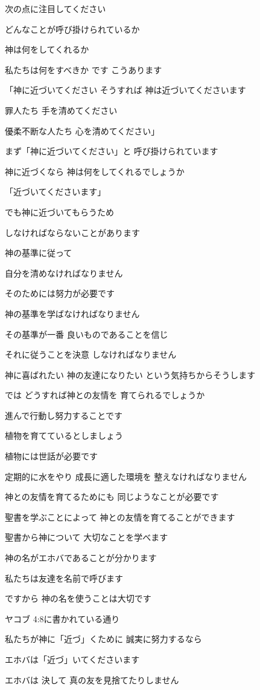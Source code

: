 \documentclass[twocolumn]{jsarticle}
\begin{document}
次の点に注目してください

どんなことが呼び掛けられているか

神は何をしてくれるか

私たちは何をすべきか です
こうあります

「神に近づいてください そうすれば
神は近づいてくださいます

罪人たち 手を清めてください

優柔不断な人たち
心を清めてください」

まず「神に近づいてください」と
呼び掛けられています

神に近づくなら
神は何をしてくれるでしょうか

「近づいてくださいます」

でも神に近づいてもらうため

しなければならないことがあります

神の基準に従って

自分を清めなければなりません

そのためには努力が必要です

神の基準を学ばなければなりません

その基準が一番
良いものであることを信じ

それに従うことを決意
しなければなりません

神に喜ばれたい 神の友達になりたい
という気持ちからそうします

では どうすれば神との友情を
育てられるでしょうか

進んで行動し努力することです

植物を育てているとしましょう

植物には世話が必要です

定期的に水をやり 成長に適した環境を
整えなければなりません

神との友情を育てるためにも
同じようなことが必要です

聖書を学ぶことによって
神との友情を育てることができます

聖書から神について
大切なことを学べます

神の名がエホバであることが分かります

私たちは友達を名前で呼びます

ですから 神の名を使うことは大切です

ヤコブ 4:8に書かれている通り

私たちが神に「近づ」くために
誠実に努力するなら

エホバは「近づ」いてくださいます

エホバは 決して
真の友を見捨てたりしません
\end{document}
